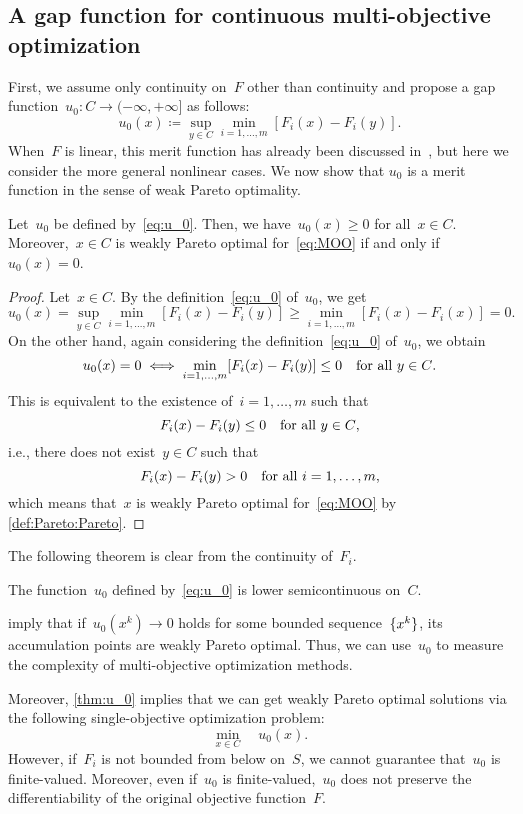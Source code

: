 \documentclass[../../main]{subfiles}
\begin{document}
\subsection{A gap function for continuous multi-objective optimization} \label{sec:merit:merit:gap}
First, we assume only continuity on~$F$ other than continuity and propose a gap function~$u_0 \colon C \to (-\infty, +\infty]$ as follows:
\begin{equation} \label{eq:u_0}
    u_0(x) \coloneqq \sup_{y \in C} \min_{i = 1, \dots, m} [ F_i(x) - F_i(y) ] 
.\end{equation}
When~$F$ is linear, this merit function has already been discussed in~\cite{Liu2009}, but here we consider the more general nonlinear cases.
We now show that $u_0$ is a merit function in the sense of weak Pareto optimality.
\begin{theorem} \label{thm:u_0}
    Let~$u_0$ be defined by~\cref{eq:u_0}.
    Then, we have~$u_0(x) \ge 0$ for all~$x \in C$.
    Moreover,~$x \in C$ is weakly Pareto optimal for~\cref{eq:MOO} if and only if~$u_0(x) = 0$.
\end{theorem}
\begin{proof}
    Let~$x \in C$.
    By the definition~\cref{eq:u_0} of~$u_0$, we get
    \[
        u_0(x) = \sup_{y \in C} \min_{i = 1, \dots, m} [ F_i(x) - F_i(y) ]
                 \ge \min_{i = 1, \dots, m} [ F_i(x) - F_i(x) ] = 0
    .\] 
    On the other hand, again considering the definition~\cref{eq:u_0} of~$u_0$, we obtain
    \[
        u_0(x) = 0 \iff \min_{i = 1, \dots, m} [ F_i(x) - F_i(y) ] \le 0 \quad \text{for all~$y \in C$}
    .\] 
    This is equivalent to the existence of~$i = 1, \dots, m$ such that
    \[
        F_i(x) - F_i(y) \le 0 \quad \text{for all~$y \in C$}
    ,\] 
    i.e., there does not exist~$y \in C$ such that
    \[
        F_i(x) - F_i(y) > 0 \quad \text{for all~$i = 1, \dots, m$}
    ,\] 
    which means that~$x$ is weakly Pareto optimal for~\cref{eq:MOO} by \cref{def:Pareto:Pareto}.
\end{proof}

The following theorem is clear from the continuity of~$F_i$.
\begin{theorem} \label{thm:cont_u_0}
    The function~$u_0$ defined by~\cref{eq:u_0} is lower semicontinuous on~$C$.
\end{theorem}
 imply that if~$u_0(x^k) \to 0$ holds for some bounded sequence~$\lbrace x^k\rbrace$, its accumulation points are weakly Pareto optimal.
Thus, we can use~$u_0$ to measure the complexity of multi-objective optimization methods.

Moreover, \cref{thm:u_0} implies that we can get weakly Pareto optimal solutions via the following single-objective optimization problem:
\[
    \min_{x \in C} \quad u_0(x)
.\] 
However, if~$F_i$ is not bounded from below on~$S$, we cannot guarantee that~$u_0$ is finite-valued.
Moreover, even if~$u_0$ is finite-valued,~$u_0$ does not preserve the differentiability of the original objective function~$F$.
\end{document}
